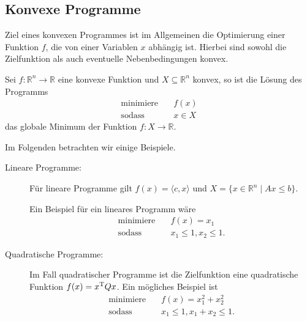 \subsection{Konvexe Programme}
Ziel eines konvexen Programmes ist im Allgemeinen die Optimierung einer Funktion $f$, die von einer Variablen $x$ abhängig ist. Hierbei sind sowohl die Zielfunktion als auch eventuelle Nebenbedingungen konvex.

\begin{Def}
Sei $f: \mathbb{R}^{n} \rightarrow \mathbb{R}$ eine konvexe Funktion und $X \subseteq \mathbb{R}^{n}$ konvex, so ist die Lösung des Programms
\begin{align*}
  \text{minimiere}  \quad& f(x)\\
  \text{sodass} \quad & x\in X
\end{align*}
das globale Minimum der Funktion $f : X\rightarrow \mathbb{R}$.
\end{Def}
\noindent Im Folgenden betrachten wir einige Beispiele.
\medskip

\begin{description}
\item[Lineare Programme:] Für lineare Programme gilt $f(x) = \langle c, x\rangle$ und $X = \{x\in \mathbb{R}^n \mid Ax \leq b\}$.

Ein Beispiel für ein lineares Programm wäre
\begin{align*}
  \text{minimiere}  \quad& f(x) = x_1\\
  \text{sodass} \quad & x_1\leq 1, x_2\leq 1.
\end{align*}

\item[Quadratische Programme:]
Im Fall quadratischer Programme ist die Zielfunktion eine quadratische Funktion $f(x) = x^{\rm T} Q x$. Ein mögliches Beispiel ist
\begin{align*}
  \text{minimiere}  \quad& f(x) = x_1^2 + x_2^2\\
  \text{sodass} \quad & x_1\leq 1, x_1 + x_2\leq 1.
\end{align*}
\end{description}

